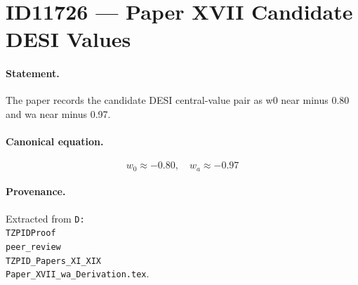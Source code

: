 \section*{ID11726 --- Paper XVII Candidate DESI Values}

\paragraph{Statement.}
The paper records the candidate DESI central-value pair as w0 near minus 0.80 and wa near minus 0.97.

\paragraph{Canonical equation.}
\[
w_0\approx-0.80,\quad w_a\approx-0.97
\]

\paragraph{Provenance.}
Extracted from \texttt{D:\\TZPIDProof\\peer\_review\\TZPID\_Papers\_XI\_XIX\\Paper\_XVII\_wa\_Derivation.tex}.
